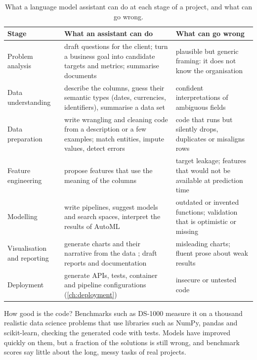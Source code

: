 \begin{table}[htbp]
\centering\small
\caption{What a language model assistant can do at each stage of a project, and what can go wrong.}\label{tab:llmstages}
\begin{tabularx}{\textwidth}{@{}>{\raggedright\arraybackslash}p{2.4cm}>{\raggedright\arraybackslash}X>{\raggedright\arraybackslash}X@{}}
\toprule
Stage & What an assistant can do & What can go wrong\\
\midrule
Problem analysis & draft questions for the client; turn a business goal into candidate targets and metrics;
summarise documents & plausible but generic framing: it does not know the organisation\\
Data understanding & describe the columns, guess their semantic types (dates, currencies, identifiers),
summarise a data set & confident interpretations of ambiguous fields\\
Data preparation & write wrangling and cleaning code from a description or a few examples; match entities,
impute values, detect errors \citep{narayan2022can,jaimovitch2023can} & code that runs but silently drops,
duplicates or misaligns rows\\
Feature engineering & propose features that use the meaning of the columns \citep{hollmann2023caafe} &
target leakage; features that would not be available at prediction time\\
Modelling & write pipelines, suggest models and search spaces, interpret the results of AutoML & outdated or
invented functions; validation that is optimistic or missing\\
Visualisation and reporting & generate charts and their narrative from the data \citep{dibia2023lida}; draft
reports and documentation & misleading charts; fluent prose about weak results\\
Deployment & generate APIs, tests, container and pipeline configurations (\cref{ch:deployment}) & insecure or
untested code\\
\bottomrule
\end{tabularx}
\end{table}

How good is the code? Benchmarks such as DS-1000 \citep{lai2023ds1000} measure it on a thousand realistic data
science problems that use libraries such as NumPy, pandas and scikit-learn, checking the generated code with tests.
Models have improved quickly on them, but a fraction of the solutions is still wrong, and benchmark scores say little
about the long, messy tasks of real projects.

